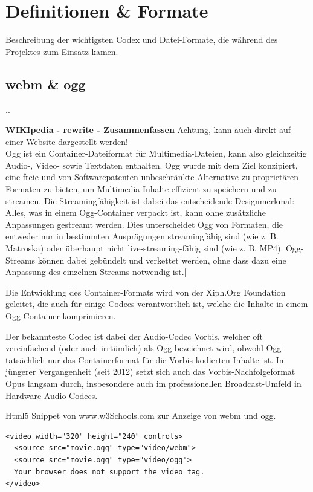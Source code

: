 \section{Definitionen \& Formate}
Beschreibung der wichtigsten Codex und Datei-Formate, die während des Projektes zum Einsatz kamen.

\subsection{webm \& ogg}
\color{red}
..



\textbf{WIKIpedia - rewrite - Zusammenfassen}
Achtung, kann auch direkt auf einer Website dargestellt werden!\\

Ogg ist ein Container-Dateiformat für Multimedia-Dateien, kann also gleichzeitig Audio-, Video- sowie Textdaten enthalten. Ogg wurde mit dem Ziel konzipiert, eine freie und von Softwarepatenten unbeschränkte Alternative zu proprietären Formaten zu bieten, um Multimedia-Inhalte effizient zu speichern und zu streamen. Die Streamingfähigkeit ist dabei das entscheidende Designmerkmal: Alles, was in einem Ogg-Container verpackt ist, kann ohne zusätzliche Anpassungen gestreamt werden. Dies unterscheidet Ogg von Formaten, die entweder nur in bestimmten Ausprägungen streamingfähig sind (wie z. B. Matroska) oder überhaupt nicht live-streaming-fähig sind (wie z. B. MP4). Ogg-Streams können dabei gebündelt und verkettet werden, ohne dass dazu eine Anpassung des einzelnen Streams notwendig ist.[

Die Entwicklung des Container-Formats wird von der Xiph.Org Foundation geleitet, die auch für einige Codecs verantwortlich ist, welche die Inhalte in einem Ogg-Container komprimieren.

Der bekannteste Codec ist dabei der Audio-Codec Vorbis, welcher oft vereinfachend (oder auch irrtümlich) als Ogg bezeichnet wird, obwohl Ogg tatsächlich nur das Containerformat für die Vorbis-kodierten Inhalte ist. In jüngerer Vergangenheit (seit 2012) setzt sich auch das Vorbis-Nachfolgeformat Opus langsam durch, insbesondere auch im professionellen Broadcast-Umfeld in Hardware-Audio-Codecs. 
\color{black}

Html5 Snippet von www.w3Schools.com zur Anzeige von webm und ogg.
\begin{verbatim}
<video width="320" height="240" controls>
  <source src="movie.ogg" type="video/webm">
  <source src="movie.ogg" type="video/ogg">
  Your browser does not support the video tag.
</video> 
\end{verbatim}


